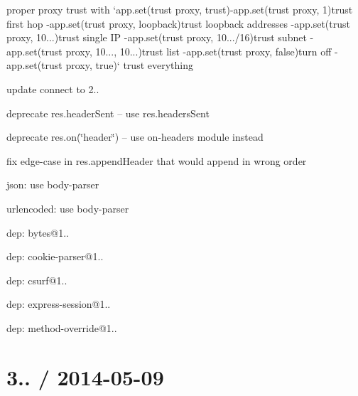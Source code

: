 \begin{DoxyItemize}
\item proper proxy trust with `app.set(\textquotesingle{}trust proxy\textquotesingle{}, trust){\ttfamily  -\/}app.\+set(\textquotesingle{}trust proxy\textquotesingle{}, 1){\ttfamily trust first hop -\/}app.\+set(\textquotesingle{}trust proxy\textquotesingle{}, \textquotesingle{}loopback\textquotesingle{}){\ttfamily trust loopback addresses -\/}app.\+set(\textquotesingle{}trust proxy\textquotesingle{}, \textquotesingle{}10...\textquotesingle{}){\ttfamily trust single I\+P -\/}app.\+set(\textquotesingle{}trust proxy\textquotesingle{}, \textquotesingle{}10.../16\textquotesingle{}){\ttfamily trust subnet -\/}app.\+set(\textquotesingle{}trust proxy\textquotesingle{}, \textquotesingle{}10..., 10...\textquotesingle{}){\ttfamily trust list -\/}app.\+set(\textquotesingle{}trust proxy\textquotesingle{}, false){\ttfamily turn off -\/}app.\+set(\textquotesingle{}trust proxy\textquotesingle{}, true)` trust everything
\item update connect to 2..
\begin{DoxyItemize}
\item deprecate {\ttfamily res.\+header\+Sent} -- use {\ttfamily res.\+headers\+Sent}
\item deprecate {\ttfamily res.\+on(\char`\"{}header\char`\"{})} -- use on-\/headers module instead
\item fix edge-\/case in {\ttfamily res.\+append\+Header} that would append in wrong order
\item json\+: use body-\/parser
\item urlencoded\+: use body-\/parser
\item dep\+: bytes@1..
\item dep\+: cookie-\/parser@1..
\item dep\+: csurf@1..
\item dep\+: express-\/session@1..
\item dep\+: method-\/override@1..
\end{DoxyItemize}
\end{DoxyItemize}

\section*{3.. / 2014-\/05-\/09 }


